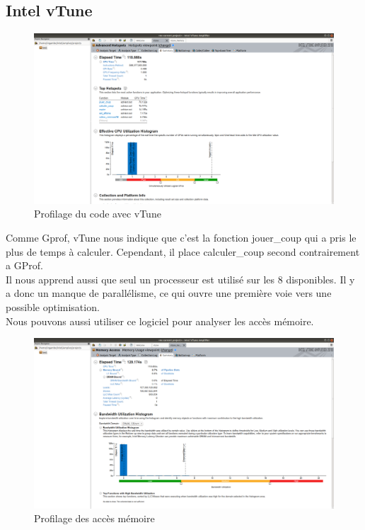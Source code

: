 \documentclass[
 aip,
 jmp,
 amsmath,amssymb,
 reprint
]{revtex4-1}
\begin{document}
\subsection{Intel vTune}
\begin{figure}[H]
  \includegraphics[width=\linewidth, keepaspectratio=true]{vtune.png}
  \caption{Profilage du code avec vTune\label{Fig:vTune_sequentiel_cpu}}
\end{figure}

Comme Gprof, vTune nous indique que c'est la fonction jouer\_coup qui a pris le plus de temps à calculer. Cependant, il place calculer\_coup second contrairement a GProf.\\
Il nous apprend aussi que seul un processeur est utilisé sur les 8 disponibles. Il y a donc un manque de parallélisme, ce qui ouvre une première voie vers une possible optimisation.\\
Nous pouvons aussi utiliser ce logiciel pour analyser les accès mémoire.\\

\begin{figure}[H]
  \includegraphics[width=\linewidth, keepaspectratio=true]{memory_vtune.png}
  \caption{Profilage des accès mémoire\label{Fig:vTune_sequentiel_mem}}
\end{figure}
\end{document}
